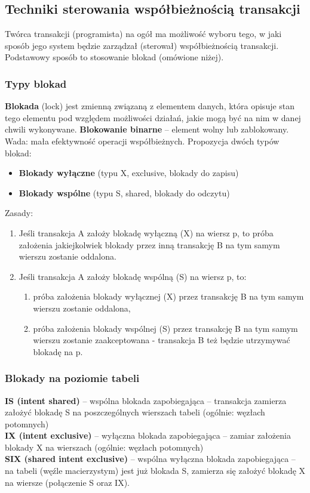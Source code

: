 \documentclass[main.tex]{subfiles}
\begin{document}
    \subsection{Techniki sterowania współbieżnością transakcji}

    Twórca transakcji (programista) na ogół ma możliwość wyboru tego, w jaki sposób jego system
    będzie zarządzał (sterował) współbieżnością transakcji.
    Podstawowy sposób to stosowanie blokad (omówione niżej).

    \subsubsection{Typy blokad}

    \textbf{Blokada} (lock) jest zmienną związaną z elementem danych, która opisuje stan tego elementu
    pod względem możliwości działań, jakie mogą być na nim w danej chwili wykonywane.
    \textbf{Blokowanie binarne} – element wolny lub zablokowany. Wada: mała efektywność operacji
    współbieżnych.
    Propozycja dwóch typów blokad:
    \begin{itemize}
        \item \textbf{Blokady wyłączne} (typu X, exclusive, blokady do zapisu)
        \item \textbf{Blokady wspólne} (typu S, shared, blokady do odczytu)
    \end{itemize}

    Zasady:
    \begin{enumerate}
        \item Jeśli transakcja A założy blokadę wyłączną (X) na wiersz p, to próba założenia jakiejkolwiek
        blokady przez inną transakcję B na tym samym wierszu zostanie oddalona.
        \item Jeśli transakcja A założy blokadę wspólną (S) na wiersz p, to:
        \begin{enumerate}
            \item próba założenia blokady wyłącznej (X) przez transakcję B na tym samym wierszu zostanie
            oddalona,
            \item próba założenia blokady wspólnej (S) przez transakcję B na tym samym wierszu zostanie
            zaakceptowana - transakcja B też będzie utrzymywać blokadę na p.
        \end{enumerate}
    \end{enumerate}

    \subsubsection{Blokady na poziomie tabeli}
    \textbf{IS (intent shared)} – wspólna blokada zapobiegająca – transakcja zamierza założyć blokadę S
    na poszczególnych wierszach tabeli (ogólnie: węzłach potomnych)\\
    \textbf{IX (intent exclusive)} – wyłączna blokada zapobiegająca – zamiar założenia blokady X na
    wierszach (ogólnie: węzłach potomnych)\\
    \textbf{SIX (shared intent exclusive)} – wspólna wyłączna blokada zapobiegająca – na tabeli (węźle
    macierzystym) jest już blokada S, zamierza się założyć blokadę X na wiersze (połączenie S
    oraz IX).
\end{document}
